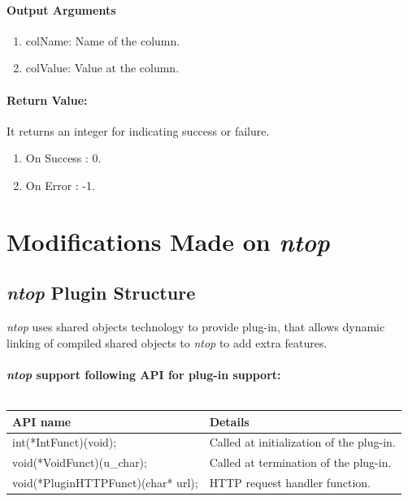 \paragraph{Output Arguments}
\begin{enumerate}
 \item colName: Name of the column.
 \item colValue: Value at the column.
\end{enumerate}

 \paragraph{Return Value:}
 It returns an integer  for indicating success or failure.
\begin{enumerate}
 \item On Success : 0.
 \item On Error   : -1.
\end{enumerate}



\section{Modifications Made on \emph{ntop} }

\subsection{\emph{ntop} Plugin Structure}
\emph{ntop} uses  shared objects technology to provide plug-in, 
that allows dynamic linking of compiled shared objects  to \emph{ntop} to add extra features. \\ \\

\textbf{\emph{ntop} support following API for plug-in support:}\\ \\
\begin{tabular}{|l|l|}
\hline
 \textbf{API name} &  \textbf{Details}\\
\hline
 int(*IntFunct)(void); & Called at initialization of the plug-in.\\
 \hline
 void(*VoidFunct)(u\_char); & Called at termination of the plug-in.\\
 \hline
 void(*PluginHTTPFunct)(char* url); & HTTP request handler function.\\
 \hline
\end{tabular}
